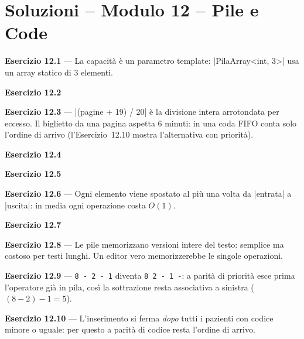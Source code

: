 \chapter{Soluzioni -- Modulo 12 -- Pile e Code}

\textbf{Esercizio 12.1} --- La capacità è un parametro template: \cc|PilaArray<int, 3>|
usa un array statico di 3 elementi.

\textbf{Esercizio 12.2}

\textbf{Esercizio 12.3} --- \cc|(pagine + 19) / 20| è la divisione intera arrotondata
per eccesso. Il biglietto da una pagina aspetta 6 minuti: in una coda FIFO conta solo
l'ordine di arrivo (l'Esercizio~12.10 mostra l'alternativa con priorità).

\textbf{Esercizio 12.4}

\textbf{Esercizio 12.5}

\textbf{Esercizio 12.6} --- Ogni elemento viene spostato al più una volta da
\cc|entrata| a \cc|uscita|: in media ogni operazione costa $O(1)$.

\textbf{Esercizio 12.7}

\textbf{Esercizio 12.8} --- Le pile memorizzano versioni intere del testo: semplice ma
costoso per testi lunghi. Un editor vero memorizzerebbe le singole operazioni.

\textbf{Esercizio 12.9} --- \texttt{8 - 2 - 1} diventa \texttt{8 2 - 1 -}: a parità di
priorità esce prima l'operatore già in pila, così la sottrazione resta associativa a
sinistra ($(8 - 2) - 1 = 5$).

\textbf{Esercizio 12.10} --- L'inserimento si ferma \emph{dopo} tutti i pazienti con
codice minore o uguale: per questo a parità di codice resta l'ordine di arrivo.
